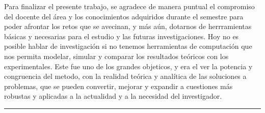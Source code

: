 \documentclass[A4,11pt]{article}
\begin{document}
Para finalizar el presente trabajo, se agradece de manera puntual el compromiso del docente del área y los conocimientos adquiridos durante el semestre para poder afrontar los retos que se avecinan, y más aún, dotarnos de herrramientas básicas y necesarias para el estudio y las futuras investigaciones. Hoy no es posible hablar de investigación si no tenemos herramientas de computación que nos permita modelar, simular y comparar los resultados teóricos con los experimentales. Este fue uno de los grandes objeticos, y era el ver la potencia y congruencia del metodo, con la realidad teórica y analítica de las soluciones a problemas, que se pueden convertir, mejorar y expandir a cuestiones más robustas y aplicadas a la actualidad y a la necesidad del investigador.
\begin{center}\rule{0.9\textwidth}{0.1mm}
\end{center}
\end{document}
